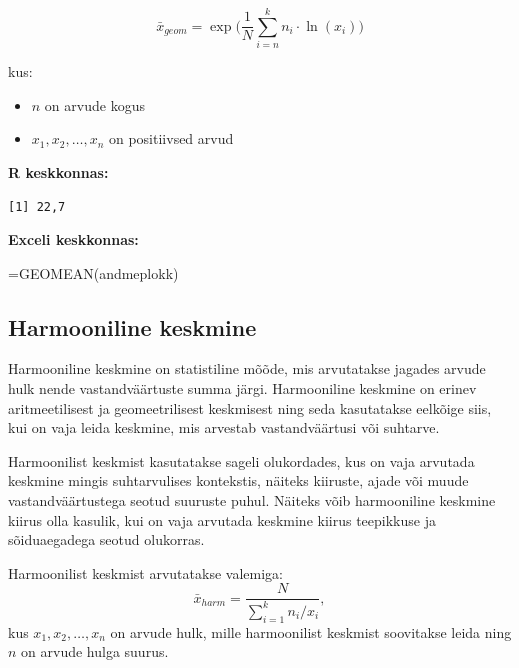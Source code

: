 \documentclass[
]{book}
\newenvironment{Shaded}{\begin{snugshade}}{\end{snugshade}}
\newcommand{\CommentTok}[1]{\textcolor[rgb]{0.56,0.35,0.01}{\textit{#1}}}
\newcommand{\FunctionTok}[1]{\textcolor[rgb]{0.13,0.29,0.53}{\textbf{#1}}}
\newcommand{\NormalTok}[1]{#1}
\newcommand{\SpecialCharTok}[1]{\textcolor[rgb]{0.81,0.36,0.00}{\textbf{#1}}}
\providecommand{\tightlist}{%
  \setlength{\itemsep}{0pt}\setlength{\parskip}{0pt}}
\renewenvironment{Shaded} {\begin{snugshade}\footnotesize} {\end{snugshade}}
\begin{document}
\[\bar x_{geom}=\exp \biggl( \frac{1}{N}\sum_{i=n}^k n_i \cdot \ln(x_i) \biggr) \]

kus:

\begin{itemize}
\tightlist
\item
  \(n\) on arvude kogus
\item
  \(x_1, x_2, \ldots, x_n\) on positiivsed arvud
\end{itemize}

\textbf{R keskkonnas:}

\begin{Shaded}
\end{Shaded}

\begin{verbatim}
[1] 22,7
\end{verbatim}

\textbf{Exceli keskkonnas:}

\begin{Shaded}
\begin{Highlighting}[]
\NormalTok{=GEOMEAN(andmeplokk)}
\end{Highlighting}
\end{Shaded}

\subsection{Harmooniline keskmine}\label{harmooniline-keskmine}

Harmooniline keskmine on statistiline mõõde, mis arvutatakse jagades arvude hulk nende vastandväärtuste summa järgi. Harmooniline keskmine on erinev aritmeetilisest ja geomeetrilisest keskmisest ning seda kasutatakse eelkõige siis, kui on vaja leida keskmine, mis arvestab vastandväärtusi või suhtarve.

Harmoonilist keskmist kasutatakse sageli olukordades, kus on vaja arvutada keskmine mingis suhtarvulises kontekstis, näiteks kiiruste, ajade või muude vastandväärtustega seotud suuruste puhul. Näiteks võib harmooniline keskmine kiirus olla kasulik, kui on vaja arvutada keskmine kiirus teepikkuse ja sõiduaegadega seotud olukorras.

Harmoonilist keskmist arvutatakse valemiga:
\[\bar x_{harm} = \frac{N}{\sum_{i=1}^k n_i / x_i},\]
kus \(x_{1}, x_{2}, \ldots, x_{n}\) on arvude hulk, mille harmoonilist keskmist soovitakse leida ning \(n\) on arvude hulga suurus.
\end{document}

